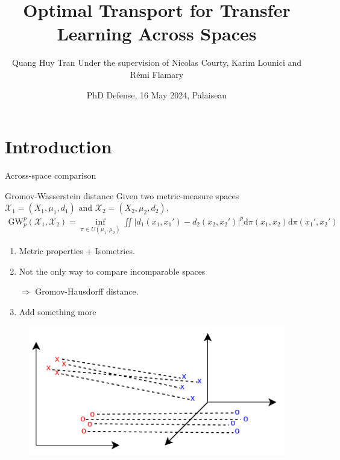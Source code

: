 \documentclass{beamer}
\title[PhD Defense]{Optimal Transport for Transfer Learning Across Spaces}
\author[]{Quang Huy Tran \break \tiny{Under the supervision of Nicolas Courty, Karim Lounici and Rémi Flamary}}
\institute[] %
{
  \inst{1}%
  Institut de Recherche en Informatique et Systèmes Aléatoires - IRISA \\
  Université Bretagne Sud
  \and
  \inst{2}%
  Centre de Mathématiques Appliquées - CMAP \\
  Ecole Polytechnique
}
\date[] %
{PhD Defense, 16 May 2024, Palaiseau}
\newcommand{\gw}{\text{GW}}
\newcommand{\cX}{\mathcal X}
\newcommand{\rmd}{\mathrm{d}}
\begin{document}
\frame{\titlepage}


\section{Introduction}
\begin{frame}

\end{frame}

\begin{frame}{Across-space comparison}
  \tiny
  \begin{block}{Gromov-Wasserstein distance \parencite{Memoli07,Memoli11}}
  Given two metric-measure spaces $\cX_1 = (X_1, \mu_1, d_1)$ and
  $\cX_2 = (X_2, \mu_2, d_2)$,
  \begin{align*}
    \gw_p^p(\cX_1, \cX_2) = \inf_{\pi \in U(\mu_1, \mu_2)}
    \iint \left| d_1(x_1, x_1') - d_2(x_2, x_2') \right|^p
    \rmd\pi(x_1, x_2) \rmd\pi(x_1', x_2')
  \end{align*}
\end{block}

\begin{minipage}[t]{0.58\linewidth}
\begin{enumerate}
  \item Metric properties + Isometries.
  \item Not the only way to compare incomparable spaces

  $\Rightarrow$ Gromov-Hausdorff distance.
  \item Add something more
\end{enumerate}
\end{minipage}%
\hfill%
\hspace{-6cm}
\begin{minipage}[t]{0.5\linewidth}
  \vspace{-0.2cm}
\begin{figure}
  \centering
  \includegraphics[width=1.2\linewidth, keepaspectratio=true]{OT_new/gw.pdf}
\end{figure}
\end{minipage}

\end{frame}
\end{document}

